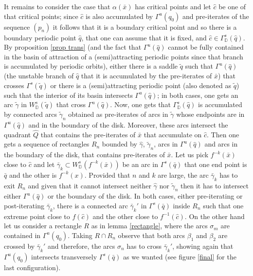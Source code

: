 \documentclass[a4paper,11pt]{article}
\theoremstyle{definition}
\def\DD{{\mathbb D}}
\def\ga{\gamma}
\def\Ga{\Gamma}
\def\be{\beta}
\def\al{\alpha}
\def\Ga{\Gamma}
\def\si{\sigma}
\begin{document}
It remains to consider the case that  $\al(\bar x)$  has critical points and let $\hat c$ be one of that critical points; since $\hat c$ is also accumulated by $\Ga^u(q_0)$ and pre-iterates of the sequence $(p_n)$ it follows that it is a boundary critical point and so there is a boundary periodic point $\hat q$,  that one can assume that it is fixed,  and $\hat c \in \Ga^s_\DD(\hat q)$.   
By proposition \ref{prop trans} (and the fact that $\Ga^u(\hat q)$ cannot be fully contained in the basin of attraction of a (semi)attracting periodic points since that branch is accumulated by periodic orbits), either there is a saddle $\tilde q$ such that $\Ga^u(\hat q)$ (the unstable branch of $\hat q$ that it is accumulated by the pre-iterates of $\bar x$) that crosses $\Ga^s(\tilde q)$ or there is a (semi)attracting periodic point (also denoted as $\tilde q$) such that the interior of its basin intersects  $\Ga^u(\hat q)$; in both cases, one gets an arc $\tilde \ga$ in  $W^s_\DD(\tilde q)$  that cross $\Ga^u(\hat q).$  Now, one  gets  that $\Ga^s_\DD(\hat q)$   is accumulated by  connected arcs $\tilde \ga_n$ obtained as pre-iterates of arcs in  $\tilde \ga$ whose endpoints are in $\Ga^u(\hat q)$ and in the boundary of the disk. Moreover, these arcs intersect the quadrant $\hat Q$ that contains the pre-iterates of $\bar x$ that accumulate on $\hat c$. Then one gets a sequence of rectangles $R_n$ bounded by $\hat \ga$, $\tilde \ga_n$, arcs in $\Ga^u(\hat q)$ and arcs in the boundary of the disk, that contains pre-iterates of $\bar x$. Let us pick $f^{-k}(\bar x)$ close to $\hat c$ and let $\bar \ga_k\subset W^s_\DD(f^{-k}(\bar x))$ be an arc in $\Ga^s(\bar q)$ that one end point is $\bar q$ and the other is $f^{-k}(x).$ Provided that $n$ and $k$ are  large, the   arc $\bar \ga_k$ has to exit $R_n$ and given that it cannot intersect neither $\hat \ga$ nor $\tilde \ga_n$ then it has to intersect either $\Ga^u(\hat q)$ or the boundary of the disk. In both cases, either pre-iterating or post-iterating $\bar \ga_k$,  there is a connected arc $\bar \ga_k'$ in $\Ga^s(\bar q)$ inside $R_n$ such that one extreme point close to $f(\hat c)$ and the other close to $f^{-1}(\hat c).$ On the other hand let us consider a rectangle $R$ as in lemma \ref{rectangle}, where the arcs $\si_m$ are contained in $\Ga^u(q_0).$ Taking $R\cap R_n$ observe that both arcs $\be_1$ and $\be_2$ are crossed by  $\bar \ga_k'$ and therefore, the arcs $\si_n$ has to cross $\bar \ga_k'$, showing again that $\Ga^u(q_0)$ intersects transversely $\Ga^s(\bar q)$ as we wanted  (see figure \ref{final} for the last configuration).
\end{document}
